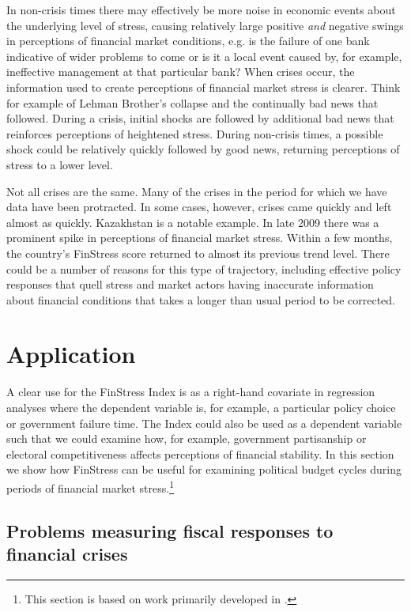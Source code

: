 \documentclass[]{article}
\begin{document}
In non-crisis times there may effectively be more noise in economic events about the underlying level of stress, causing relatively large positive \emph{and} negative swings in perceptions of financial market conditions, e.g. is the failure of one bank indicative of wider problems to come or is it a local event caused by, for example, ineffective management at that particular bank? When crises occur, the information used to create perceptions of financial market stress is clearer. Think for example of Lehman Brother's collapse and the continually bad news that followed. During a crisis, initial shocks are followed by additional bad news that reinforces perceptions of heightened stress. During non-crisis times, a possible shock could be relatively quickly followed by good news, returning perceptions of stress to a lower level.

Not all crises are the same. Many of the crises in the period for which we have data have been protracted. In some cases, however, crises came quickly and left almost as quickly. Kazakhstan is a notable example. In late 2009 there was a prominent spike in perceptions of financial market stress. Within a few months, the country's FinStress score returned to almost its previous trend level. There could be a number of reasons for this type of trajectory, including effective policy responses that quell stress and market actors having inaccurate information about financial conditions that takes a longer than usual period to be corrected.

\section{Application}\label{application}

A clear use for the FinStress Index is as a right-hand covariate in regression analyses where the dependent variable is, for example, a particular policy choice or government failure time. The Index could also be used as a dependent variable such that we could examine how, for example, government partisanship or electoral competitiveness affects perceptions of financial stability. In this section we show how FinStress can be useful for examining political budget cycles during periods of financial market stress.\footnote{This section is based on work primarily developed in \cite{gandrudHallerbergPBC}.}

\subsection{Problems measuring fiscal responses to financial crises}
\end{document}
